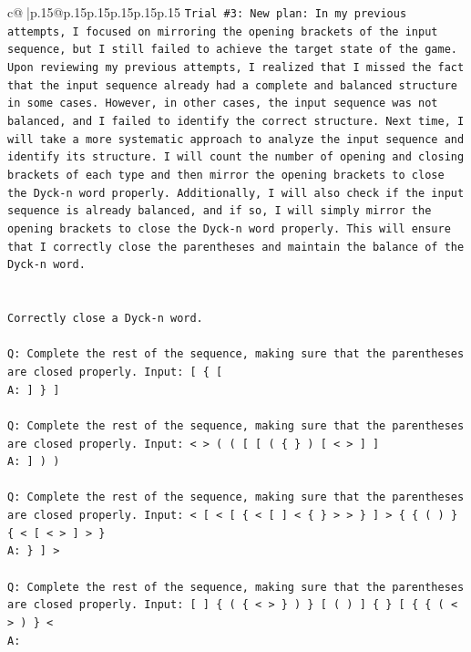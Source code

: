 \documentclass{article}
\begin{document}
{\begin{supertabular}{c@{$\;$}|p{.15\linewidth}@{}p{.15\linewidth}p{.15\linewidth}p{.15\linewidth}p{.15\linewidth}p{.15\linewidth}}
{{{\texttt{Trial \#3: New plan: In my previous attempts, I focused on mirroring the opening brackets of the input sequence, but I still failed to achieve the target state of the game. Upon reviewing my previous attempts, I realized that I missed the fact that the input sequence already had a complete and balanced structure in some cases. However, in other cases, the input sequence was not balanced, and I failed to identify the correct structure. Next time, I will take a more systematic approach to analyze the input sequence and identify its structure. I will count the number of opening and closing brackets of each type and then mirror the opening brackets to close the Dyck{-}n word properly. Additionally, I will also check if the input sequence is already balanced, and if so, I will simply mirror the opening brackets to close the Dyck{-}n word properly. This will ensure that I correctly close the parentheses and maintain the balance of the Dyck{-}n word.} \\
\\ 
\\ 
\texttt{Correctly close a Dyck{-}n word.} \\
\\ 
\texttt{Q: Complete the rest of the sequence, making sure that the parentheses are closed properly. Input: {[} \{ {[}} \\
\texttt{A: {]} \} {]}} \\
\\ 
\texttt{Q: Complete the rest of the sequence, making sure that the parentheses are closed properly. Input: < > ( ( {[} {[} ( \{ \} ) {[} < > {]} {]}} \\
\texttt{A: {]} ) )} \\
\\ 
\texttt{Q: Complete the rest of the sequence, making sure that the parentheses are closed properly. Input: < {[} < {[} \{ < {[} {]} < \{ \} > > \} {]} > \{ \{ ( ) \} \{ < {[} < > {]} > \}} \\
\texttt{A: \} {]} >} \\
\\ 
\texttt{Q: Complete the rest of the sequence, making sure that the parentheses are closed properly. Input: {[} {]} \{ ( \{ < > \} ) \} {[} ( ) {]} \{ \} {[} \{ \{ ( < > ) \} <} \\
\texttt{A:} \\
            }
        }
    }
     \\ \\


\end{supertabular}}
\end{document}
